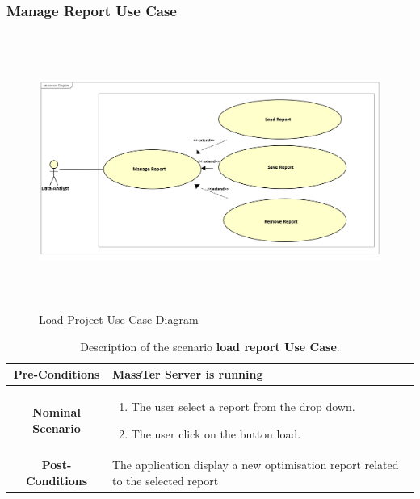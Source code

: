  \subsubsection{Manage Report Use Case}
	 	\begin{figure}[h]
	\centering
	\includegraphics[width=16cm,height=9cm]{manageReport.png}
	\caption{Load Project Use Case Diagram}
	
\end{figure}

 \begin{table}[!h]
 	\caption{Description of the scenario \textbf{load report Use Case}.}
 	\label{DSTabLR}
 	\centering
 	\begin{tabular}{|c|p{10cm}|}
 		\hline 	
 		\textbf{Pre-Conditions } & MassTer Server is running \\ 
 		\hline                     
 		\textbf{Nominal Scenario } &  \begin{enumerate}
 			\item The user select a report from the drop down.
 			\item The user click on the button load.
 		\end{enumerate} \\ 
 		\hline 
 		\textbf{Post-Conditions} & The application display a new optimisation report related to the selected report \\
 		\hline 
 	\end{tabular}
 \end{table}
 
